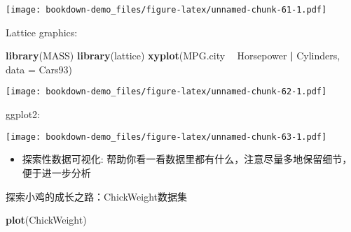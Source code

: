 \documentclass[]{book}
\newenvironment{Shaded}{\begin{snugshade}}{\end{snugshade}}
\newcommand{\CharTok}[1]{\textcolor[rgb]{0.31,0.60,0.02}{#1}}
\newcommand{\DataTypeTok}[1]{\textcolor[rgb]{0.13,0.29,0.53}{#1}}
\newcommand{\DecValTok}[1]{\textcolor[rgb]{0.00,0.00,0.81}{#1}}
\newcommand{\KeywordTok}[1]{\textcolor[rgb]{0.13,0.29,0.53}{\textbf{#1}}}
\newcommand{\NormalTok}[1]{#1}
\newcommand{\OperatorTok}[1]{\textcolor[rgb]{0.81,0.36,0.00}{\textbf{#1}}}
\newcommand{\StringTok}[1]{\textcolor[rgb]{0.31,0.60,0.02}{#1}}
\providecommand{\tightlist}{%
  \setlength{\itemsep}{0pt}\setlength{\parskip}{0pt}}
\begin{document}
\texttt{[image: bookdown-demo\_files/figure-latex/unnamed-chunk-61-1.pdf]}

Lattice graphics:

\begin{Shaded}
\begin{Highlighting}[]
\KeywordTok{library}\NormalTok{(MASS)}
\KeywordTok{library}\NormalTok{(lattice)}
\KeywordTok{xyplot}\NormalTok{(MPG.city }\OperatorTok{~}\StringTok{ }\NormalTok{Horsepower }\OperatorTok{|}\StringTok{ }\NormalTok{Cylinders, }\DataTypeTok{data =}\NormalTok{ Cars93)}
\end{Highlighting}
\end{Shaded}

\texttt{[image: bookdown-demo\_files/figure-latex/unnamed-chunk-62-1.pdf]}

ggplot2:

\begin{Shaded}
\end{Shaded}

\texttt{[image: bookdown-demo\_files/figure-latex/unnamed-chunk-63-1.pdf]}

\begin{itemize}
\tightlist
\item
  探索性数据可视化:
  帮助你看一看数据里都有什么，注意尽量多地保留细节，便于进一步分析
\end{itemize}

探索小鸡的成长之路：ChickWeight数据集

\begin{Shaded}
\begin{Highlighting}[]
\KeywordTok{plot}\NormalTok{(ChickWeight)}
\end{Highlighting}
\end{Shaded}
\end{document}
